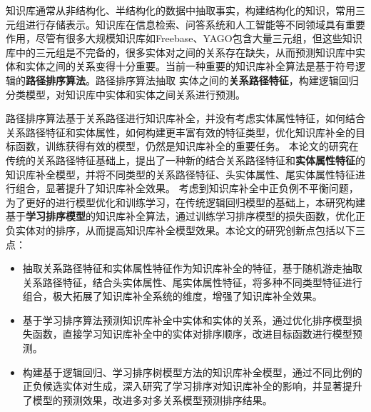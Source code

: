 

\makeatletter





\begin{cabstract}
知识库通常从非结构化、半结构化的数据中抽取事实，构建结构化的知识，常用三元组进行存储表示。知识库在信息检索、问答系统和人工智能等不同领域具有重要作用，尽管有很多大规模知识库如Freebase、YAGO包含大量三元组，但这些知识库中的三元组是不完备的，很多实体对之间的关系存在缺失，从而预测知识库中实体和实体之间的关系变得十分重要。当前一种重要的知识库补全算法是基于符号逻辑的\textbf{路径排序算法}。路径排序算法抽取
实体之间的\textbf{关系路径特征}，构建逻辑回归分类模型，对知识库中实体和实体之间关系进行预测。

路径排序算法基于关系路径进行知识库补全，并没有考虑实体属性特征，如何结合关系路径特征和实体属性，如何构建更丰富有效的特征类型，优化知识库补全的目标函数，训练获得有效的模型，仍然是知识库补全的重要任务。
本论文的研究在传统的关系路径特征基础上，提出了一种新的结合关系路径特征和\textbf{实体属性特征}的知识库补全模型，并将不同类型的关系路径特征、头实体属性、尾实体属性特征进行组合，显著提升了知识库补全效果。
考虑到知识库补全中正负例不平衡问题，为了更好的进行模型优化和训练学习，在传统逻辑回归模型的基础上，本研究构建基于\textbf{学习排序模型}的知识库补全算法，通过训练学习排序模型的损失函数，优化正负实体对的排序，从而提高知识库补全模型效果。本论文的研究创新点包括以下三点：
\begin{itemize}[$\bullet$]
    \item 抽取关系路径特征和实体属性特征作为知识库补全的特征，基于随机游走抽取关系路径特征，结合头实体属性、尾实体属性特征，将多种不同类型特征进行组合，极大拓展了知识库补全系统的维度，增强了知识库补全效果。
    \item 基于学习排序算法预测知识库补全中实体和实体的关系，通过优化排序模型损失函数，直接学习知识库补全中的实体对排序顺序，改进目标函数进行模型预测。
    \item 构建基于逻辑回归、学习排序树模型方法的知识库补全模型，通过不同比例的正负候选实体对生成，深入研究了学习排序对知识库补全的影响，并显著提升了模型的预测效果，改进多对多关系模型预测排序结果。
\end{itemize}
\end{cabstract}

